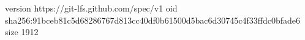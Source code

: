 version https://git-lfs.github.com/spec/v1
oid sha256:91bceb81c5d68286767d813cc40df0b61500d5bac6d30745c4f33ffdc0bfade6
size 1912
